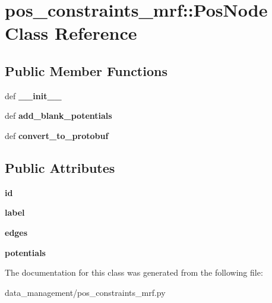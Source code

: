 \hypertarget{classpos__constraints__mrf_1_1PosNode}{
\section{pos\_\-constraints\_\-mrf::PosNode Class Reference}
\label{classpos__constraints__mrf_1_1PosNode}
}
\subsection*{Public Member Functions}
\begin{DoxyCompactItemize}
\item 
\hypertarget{classpos__constraints__mrf_1_1PosNode_a5806f418b1fcf95fc35df7cb3d212c3c}{
def {\bfseries \_\-\_\-init\_\-\_\-}}
\label{classpos__constraints__mrf_1_1PosNode_a5806f418b1fcf95fc35df7cb3d212c3c}

\item 
\hypertarget{classpos__constraints__mrf_1_1PosNode_a5b09a1ebfe88f7e01be103e0a389f35b}{
def {\bfseries add\_\-blank\_\-potentials}}
\label{classpos__constraints__mrf_1_1PosNode_a5b09a1ebfe88f7e01be103e0a389f35b}

\item 
\hypertarget{classpos__constraints__mrf_1_1PosNode_a0f219a3a2e91b04d053c15fb2bd0db6f}{
def {\bfseries convert\_\-to\_\-protobuf}}
\label{classpos__constraints__mrf_1_1PosNode_a0f219a3a2e91b04d053c15fb2bd0db6f}

\end{DoxyCompactItemize}
\subsection*{Public Attributes}
\begin{DoxyCompactItemize}
\item 
\hypertarget{classpos__constraints__mrf_1_1PosNode_ac34924f0bee456c594a5adeb58c40502}{
{\bfseries id}}
\label{classpos__constraints__mrf_1_1PosNode_ac34924f0bee456c594a5adeb58c40502}

\item 
\hypertarget{classpos__constraints__mrf_1_1PosNode_a9263468af13640d55a884500b87dbf36}{
{\bfseries label}}
\label{classpos__constraints__mrf_1_1PosNode_a9263468af13640d55a884500b87dbf36}

\item 
\hypertarget{classpos__constraints__mrf_1_1PosNode_ad36d2ab5212a11cb117ba91ba219e8ff}{
{\bfseries edges}}
\label{classpos__constraints__mrf_1_1PosNode_ad36d2ab5212a11cb117ba91ba219e8ff}

\item 
\hypertarget{classpos__constraints__mrf_1_1PosNode_adbfbeb5b4ce5c7d3e012a57266743d85}{
{\bfseries potentials}}
\label{classpos__constraints__mrf_1_1PosNode_adbfbeb5b4ce5c7d3e012a57266743d85}

\end{DoxyCompactItemize}


The documentation for this class was generated from the following file:\begin{DoxyCompactItemize}
\item 
data\_\-management/pos\_\-constraints\_\-mrf.py\end{DoxyCompactItemize}

